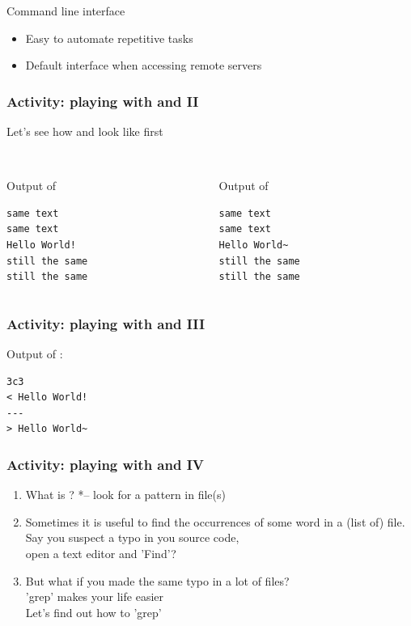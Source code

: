 \begin{frame}{Command line interface}
\begin{itemize}
\item Easy to automate repetitive tasks
\item Default interface when accessing remote servers %
\end{itemize}
\end{frame}

\begin{frame}[fragile]
\frametitle{Activity: playing with  and  II}
Let's see how  and  look like first

\begin{columns}
\begin{column}{0.5\textwidth}
\\ Output of 

\begin{verbatim}
same text
same text
Hello World!
still the same
still the same
\end{verbatim}
\end{column}

\begin{column}{0.5\textwidth}
\\ Output of 
\begin{verbatim}
same text
same text
Hello World~
still the same
still the same
\end{verbatim}
\end{column}
\end{columns}
\end{frame}


\begin{frame}[fragile]
\frametitle{Activity: playing with  and  III}
Output of  :
\begin{verbatim}
3c3
< Hello World!
---
> Hello World~
\end{verbatim}
\end{frame}


\begin{frame}
\frametitle{Activity: playing with  and  IV}
\begin{enumerate}
\item What is ? *-- look for a pattern in file(s)
\item Sometimes it is useful to find the occurrences of some word in a (list of) file.\\ 
Say you suspect a typo in you source code,\\ 
open a text editor and 'Find'?
\item But what if you made the same typo in a lot of files?\\
'grep' makes your life easier\\
Let's find out how to 'grep'
\end{enumerate}
\end{frame}


